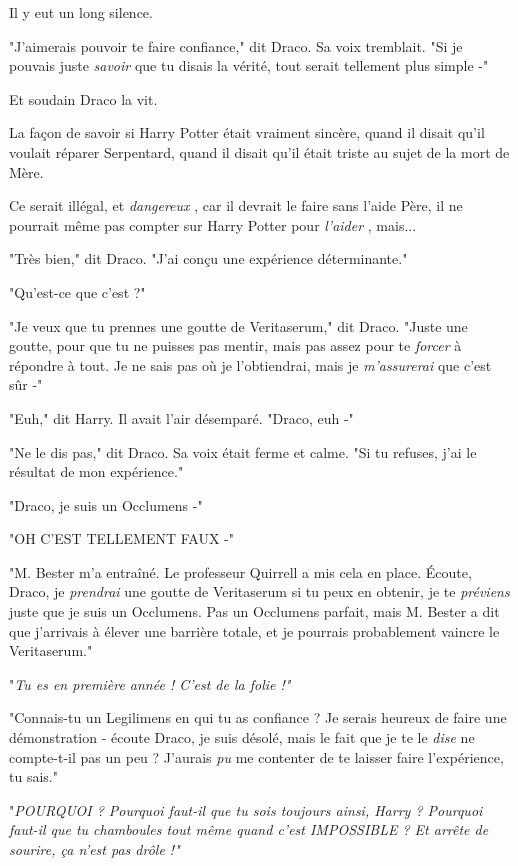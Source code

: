 Il y eut un long silence.

"J'aimerais pouvoir te faire confiance," dit Draco. Sa voix tremblait. "Si je pouvais juste \emph{savoir}  que tu disais la vérité, tout serait tellement plus simple -"

Et soudain Draco la vit.

La façon de savoir si Harry Potter était vraiment sincère, quand il disait qu'il voulait réparer Serpentard, quand il disait qu'il était triste au sujet de la mort de Mère.

Ce serait illégal, et \emph{dangereux} , car il devrait le faire sans l'aide Père, il ne pourrait même pas compter sur Harry Potter pour \emph{l'aider} , mais...

"Très bien," dit Draco. "J'ai conçu une expérience déterminante."

"Qu'est-ce que c'est ?"

"Je veux que tu prennes une goutte de Veritaserum," dit Draco. "Juste une goutte, pour que tu ne puisses pas mentir, mais pas assez pour te \emph{forcer}  à répondre à tout. Je ne sais pas où je l'obtiendrai, mais je \emph{m'assurerai}  que c'est sûr -"

"Euh," dit Harry. Il avait l'air désemparé. "Draco, euh -"

"Ne le dis pas," dit Draco. Sa voix était ferme et calme. "Si tu refuses, j'ai le résultat de mon expérience."

"Draco, je suis un Occlumens -"

"OH C'EST TELLEMENT FAUX -"

"M. Bester m'a entraîné. Le professeur Quirrell a mis cela en place. Écoute, Draco, je \emph{prendrai}  une goutte de Veritaserum si tu peux en obtenir, je te \emph{préviens } juste que je suis un Occlumens. Pas un Occlumens parfait, mais M. Bester a dit que j'arrivais à élever une barrière totale, et je pourrais probablement vaincre le Veritaserum."

"\emph{Tu es en première année ! C'est de la folie !"} 

"Connais-tu un Legilimens en qui tu as confiance ? Je serais heureux de faire une démonstration - écoute Draco, je suis désolé, mais le fait que je te le \emph{dise}  ne compte-t-il pas un peu ? J'aurais\emph{ pu}  me contenter de te laisser faire l'expérience, tu sais."

"\emph{POURQUOI ? Pourquoi faut-il que tu sois toujours ainsi, Harry ? Pourquoi faut-il que tu chamboules tout même quand c'est IMPOSSIBLE ? Et arrête de sourire, ça n'est pas drôle !"} 

